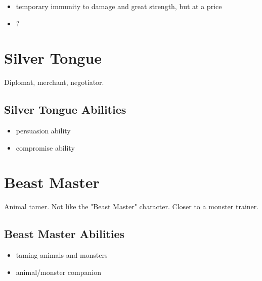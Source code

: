\begin{multicols}{2}
\begin{itemize}
    \item temporary immunity to damage and great strength, but at a price
    \item ?
\end{itemize}

\section{Silver Tongue}

Diplomat, merchant, negotiator.

\subsection{Silver Tongue Abilities}

\begin{itemize}
    \item persuasion ability
    \item compromise ability
\end{itemize}

\section{Beast Master}

Animal tamer. Not like the "Beast Master" character. Closer to a monster trainer.

\subsection{Beast Master Abilities}

\begin{itemize}
    \item taming animals and monsters
    \item animal/monster companion
\end{itemize}

\end{multicols}
